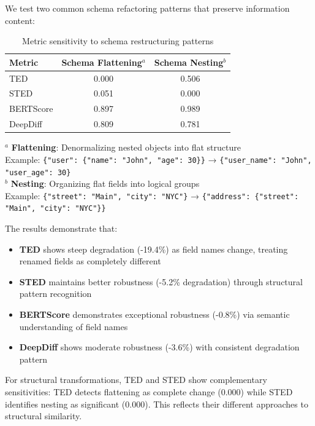 \documentclass{article}
\begin{document}
We test two common schema refactoring patterns that preserve information content:

\begin{table}[H]
\centering
\caption{Metric sensitivity to schema restructuring patterns}
\label{tab:structural-perturbations}
\begin{tabular}{lcc}
\toprule
\textbf{Metric} & \textbf{Schema Flattening}$^a$ & \textbf{Schema Nesting}$^b$ \\
\midrule
TED & 0.000 & 0.506 \\
STED & 0.051 & 0.000 \\
BERTScore & 0.897 & 0.989 \\
DeepDiff & 0.809 & 0.781 \\
\bottomrule
\end{tabular}
\vspace{2mm}
\begin{flushleft}
\small $^a$ \textbf{Flattening}: Denormalizing nested objects into flat structure\\
\small Example: \texttt{\{"user": \{"name": "John", "age": 30\}\}} → \texttt{\{"user\_name": "John", "user\_age": 30\}}\\[1mm]
\small $^b$ \textbf{Nesting}: Organizing flat fields into logical groups\\
\small Example: \texttt{\{"street": "Main", "city": "NYC"\}} → \texttt{\{"address": \{"street": "Main", "city": "NYC"\}\}}
\end{flushleft}
\end{table}

The results demonstrate that:
\begin{itemize}
\item \textbf{TED} shows steep degradation (-19.4\%) as field names change, treating renamed fields as completely different
\item \textbf{STED} maintains better robustness (-5.2\% degradation) through structural pattern recognition
\item \textbf{BERTScore} demonstrates exceptional robustness (-0.8\%) via semantic understanding of field names
\item \textbf{DeepDiff} shows moderate robustness (-3.6\%) with consistent degradation pattern
\end{itemize}

For structural transformations, TED and STED show complementary sensitivities: TED detects flattening as complete change (0.000) while STED identifies nesting as significant (0.000). This reflects their different approaches to structural similarity.
\end{document}
